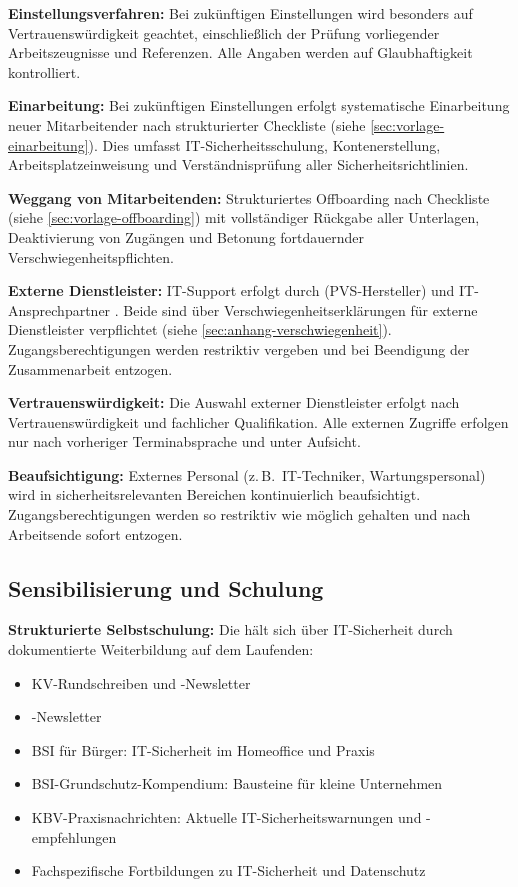 \textbf{Einstellungsverfahren:} Bei zukünftigen Einstellungen wird besonders auf
Vertrauenswürdigkeit geachtet, einschließlich der Prüfung vorliegender Arbeitszeugnisse
und Referenzen. Alle Angaben werden auf Glaubhaftigkeit kontrolliert.

\textbf{Einarbeitung:} Bei zukünftigen Einstellungen erfolgt systematische Einarbeitung
neuer Mitarbeitender nach strukturierter Checkliste (siehe \cref{sec:vorlage-einarbeitung}).
Dies umfasst IT-Sicherheitsschulung, Kontenerstellung, Arbeitsplatzeinweisung und
Verständnisprüfung aller Sicherheitsrichtlinien.

\textbf{Weggang von Mitarbeitenden:} Strukturiertes Offboarding nach Checkliste
(siehe \cref{sec:vorlage-offboarding}) mit vollständiger Rückgabe aller Unterlagen,
Deaktivierung von Zugängen und Betonung fortdauernder Verschwiegenheitspflichten.

\textbf{Externe Dienstleister:} IT-Support erfolgt durch \PVSHersteller{} (PVS-Hersteller) und IT-Ansprechpartner \ITAnsprechpartner. Beide sind über Verschwiegenheitserklärungen für externe Dienstleister verpflichtet (siehe \cref{sec:anhang-verschwiegenheit}). Zugangsberechtigungen werden restriktiv vergeben und bei Beendigung der Zusammenarbeit entzogen.

\textbf{Vertrauenswürdigkeit:} Die Auswahl externer Dienstleister erfolgt nach
Vertrauenswürdigkeit und fachlicher Qualifikation. Alle externen Zugriffe erfolgen nur
nach vorheriger Terminabsprache und unter Aufsicht.

\textbf{Beaufsichtigung:} Externes Personal (z.\,B.\ IT-Techniker, Wartungspersonal) wird
in sicherheitsrelevanten Bereichen kontinuierlich beaufsichtigt. Zugangsberechtigungen
werden so restriktiv wie möglich gehalten und nach Arbeitsende sofort entzogen.

\subsection{Sensibilisierung und Schulung}
\label{sec:sensibilisierung}

\textbf{Strukturierte Selbstschulung:} Die \PraxisInhaberBezeichnung{} hält sich über IT-Sicherheit
durch dokumentierte Weiterbildung auf dem Laufenden:
\begin{itemize}
  \item KV-Rundschreiben und -Newsletter
  \item \PVSName{}-Newsletter
  \item BSI für Bürger: IT-Sicherheit im Homeoffice und Praxis
  \item BSI-Grundschutz-Kompendium: Bausteine für kleine Unternehmen
  \item KBV-Praxisnachrichten: Aktuelle IT-Sicherheitswarnungen und -empfehlungen
  \item Fachspezifische Fortbildungen zu IT-Sicherheit und Datenschutz
\end{itemize}

